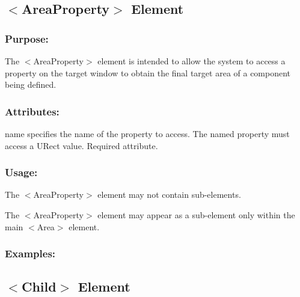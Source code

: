 \hypertarget{fal_element_ref_fal_elem_ref_sec_4}{}\subsection{$<$\+Area\+Property$>$ Element}\label{fal_element_ref_fal_elem_ref_sec_4}
\hypertarget{fal_element_ref_fal_elem_ref_sec_4_1}{}\subsubsection{Purpose\+:}\label{fal_element_ref_fal_elem_ref_sec_4_1}
The {\ttfamily $<$Area\+Property$>$} element is intended to allow the system to access a property on the target window to obtain the final target area of a component being defined.\hypertarget{fal_element_ref_fal_elem_ref_sec_4_2}{}\subsubsection{Attributes\+:}\label{fal_element_ref_fal_elem_ref_sec_4_2}
\begin{DoxyItemize}
\item {\ttfamily name} specifies the name of the property to access. The named property must access a U\+Rect value. Required attribute.\end{DoxyItemize}
\hypertarget{fal_element_ref_fal_elem_ref_sec_4_3}{}\subsubsection{Usage\+:}\label{fal_element_ref_fal_elem_ref_sec_4_3}
\begin{DoxyItemize}
\item The {\ttfamily $<$Area\+Property$>$} element may not contain sub-\/elements. \item The {\ttfamily $<$Area\+Property$>$} element may appear as a sub-\/element only within the main {\ttfamily $<$Area$>$} element.\end{DoxyItemize}
\hypertarget{fal_element_ref_fal_elem_ref_sec_4_4}{}\subsubsection{Examples\+:}\label{fal_element_ref_fal_elem_ref_sec_4_4}
\hypertarget{fal_element_ref_fal_elem_ref_sec_5}{}\subsection{$<$\+Child$>$ Element}\label{fal_element_ref_fal_elem_ref_sec_5}
